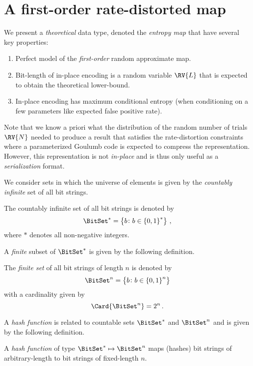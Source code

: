 \documentclass[ ../main.tex]{subfiles}
\begin{document}
\section{A first-order rate-distorted map}
We present a \emph{theoretical} data type, denoted the \emph{entropy map} that have several key properties:
\begin{enumerate}
\item Perfect model of the \emph{first-order} random approximate map.
\item Bit-length of in-place encoding is a random variable $\RV{L}$ that is expected to obtain the theoretical lower-bound.
\item In-place encoding has maximum conditional entropy (when conditioning on a few parameters like expected false positive rate).
\end{enumerate}
Note that we know a priori what the distribution of the random number of trials $\RV{N}$ needed to produce a result that satisfies the rate-distortion constraints where a parameterized Goulumb code is expected to compress the representation.
However, this representation is not \emph{in-place} and is thus only useful as a \emph{serialization} format.

We consider sets in which the universe of elements is given by the \emph{countably infinite} set of all bit strings.
\begin{definition}
The countably infinite set of all bit strings is denoted by
\begin{equation}
    \BitSet^* = \left\{b \colon b \in \left\{0,1\right\}^*\right\}\,,
\end{equation}
where $*$ denotes all non-negative integers.
\end{definition}
A \emph{finite} subset of $\BitSet^*$ is given by the following definition.
\begin{definition}
The \emph{finite set} of all bit strings of length $n$ is denoted by
\begin{equation}
    \BitSet^n = \left\{b \colon b \in \left\{0,1\right\}^n\right\}
\end{equation}
with a cardinality given by
\begin{equation}
    \Card{\BitSet^n} = 2^n\,.
\end{equation}
\end{definition}

A \emph{hash function} is related to countable sets $\BitSet^*$ and $\BitSet^n$ and is given by the following definition.
\begin{definition}
A \emph{hash function} of type $\BitSet^* \mapsto \BitSet^n$ maps (hashes) bit strings of arbitrary-length to bit strings of fixed-length $n$.
\end{definition}
\end{document}

